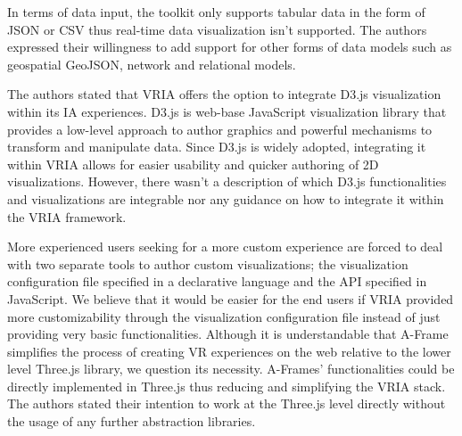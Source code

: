 \documentclass{vgtc}                          %
\begin{document}
\smallskip

\noindent In terms of data input, the toolkit only supports tabular data in the form of
JSON or CSV thus real-time data visualization isn't supported. The authors
expressed their willingness to add support for other forms of data models such as
geospatial GeoJSON, network and relational models.

\smallskip

\noindent The authors stated that VRIA offers the option to integrate D3.js
visualization within its IA experiences. D3.js is web-base JavaScript
visualization library that provides a low-level approach to author graphics and
powerful mechanisms to transform and manipulate data. Since D3.js is widely
adopted, integrating it within VRIA allows for easier usability and quicker
authoring of 2D visualizations. However, there wasn't a description of
which D3.js functionalities and visualizations are integrable nor any guidance
on how to integrate it within the VRIA framework.

\smallskip

\noindent More experienced users seeking for a more custom experience are
forced to deal with two separate tools to author custom visualizations;
the visualization configuration file specified in a declarative language and
the API specified in JavaScript. We believe that it would be easier for the end users if VRIA
provided more customizability through the visualization configuration file instead of just
providing very basic functionalities.
Although it is understandable that A-Frame simplifies the process of creating
VR experiences on the web relative to the lower level Three.js library, we
question its necessity. A-Frames' functionalities could be directly implemented
in Three.js thus reducing and simplifying the VRIA stack. The authors stated
their intention to work at the Three.js level directly without the usage of any further
abstraction libraries.

\smallskip
\end{document}
